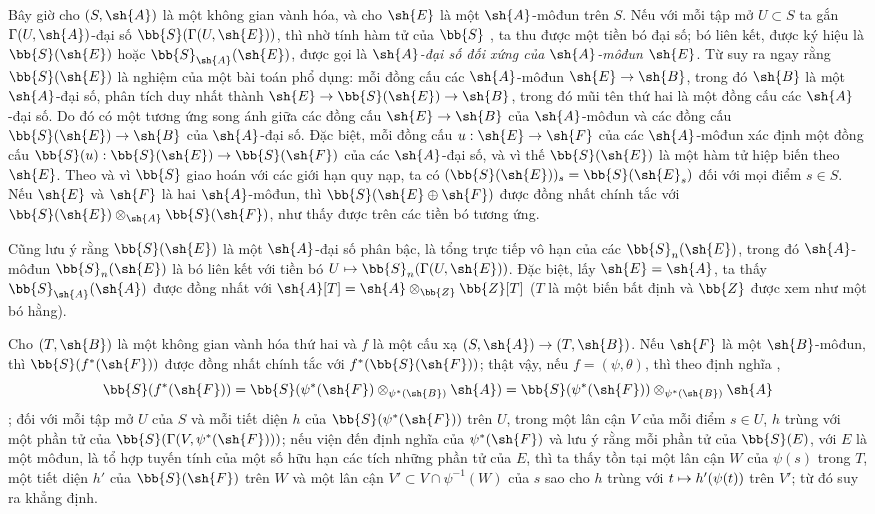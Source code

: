 \documentclass[oneside,10pt]{amsart}
\makeatletter
\newcommand{\ega@arrow}[2]{\mathchoice{#1}{#2}{#2}{#2}}
\let\ega@shortmapsto\mapsto
\renewcommand{\to}{\ega@arrow{\longrightarrow}{\rightarrow}}
\renewcommand{\mapsto}{\ega@arrow{\longmapsto}{\ega@shortmapsto}}
\newcommand{\oldpage}[2][]{\marginnote{\normalfont\footnotesize\textbf{#1}~|~#2}\ignorespaces}
\let\EGAOriginalLabel\label
\renewcommand{\label}[1]{\phantomsection\EGAOriginalLabel{#1}}
\makeatother
\begin{document}
\begin{env}[1.7.4]
\label{II.1.7.4}
Bây giờ cho $(S,\sh{A})$ là một không gian vành hóa, và cho $\sh{E}$ là một $\sh{A}$-môđun trên $S$.
Nếu với mỗi tập mở $U\subset S$ ta gắn $\Gamma(U,\sh{A})$-đại số $\bb{S}(\Gamma(U,\sh{E}))$, thì nhờ tính hàm tử của $\bb{S}$ , ta thu được một tiền bó đại số; bó liên kết, được ký hiệu là $\bb{S}(\sh{E})$ hoặc $\bb{S}_\sh{A}(\sh{E})$, được gọi là \emph{$\sh{A}$-đại số đối xứng của $\sh{A}$-môđun $\sh{E}$}.
Từ  suy ra ngay rằng $\bb{S}(\sh{E})$ là nghiệm của một bài toán phổ dụng: mỗi đồng cấu các $\sh{A}$-môđun $\sh{E}\to\sh{B}$, trong đó $\sh{B}$ là một $\sh{A}$-đại số, phân tích duy nhất thành $\sh{E}\to\bb{S}(\sh{E})\to\sh{B}$, trong đó mũi tên thứ hai là một đồng cấu các $\sh{A}$-đại số.
Do đó có một tương ứng song ánh giữa các đồng cấu $\sh{E}\to\sh{B}$ của $\sh{A}$-môđun và các đồng cấu $\bb{S}(\sh{E})\to\sh{B}$ của $\sh{A}$-đại số.
Đặc biệt, mỗi đồng cấu $u:\sh{E}\to\sh{F}$ của các $\sh{A}$-môđun xác định một đồng cấu $\bb{S}(u):\bb{S}(\sh{E})\to\bb{S}(\sh{F})$ của các $\sh{A}$-đại số, và vì thế $\bb{S}(\sh{E})$ là một hàm tử hiệp biến theo $\sh{E}$.
\oldpage[II]{16}
Theo  và vì $\bb{S}$ giao hoán với các giới hạn quy nạp, ta có $(\bb{S}(\sh{E}))_s=\bb{S}(\sh{E}_s)$ đối với mọi điểm $s\in S$.
Nếu $\sh{E}$ và $\sh{F}$ là hai $\sh{A}$-môđun, thì $\bb{S}(\sh{E}\oplus\sh{F})$ được đồng nhất chính tắc với $\bb{S}(\sh{E})\otimes_\sh{A}\bb{S}(\sh{F})$, như thấy được trên các tiền bó tương ứng.

Cũng lưu ý rằng $\bb{S}(\sh{E})$ là một $\sh{A}$-đại số phân bậc, là tổng trực tiếp vô hạn của các $\bb{S}_n(\sh{E})$, trong đó $\sh{A}$-môđun $\bb{S}_n(\sh{E})$ là bó liên kết với tiền bó $U\mapsto\bb{S}_n(\Gamma(U,\sh{E}))$.
Đặc biệt, lấy $\sh{E}=\sh{A}$, ta thấy $\bb{S}_\sh{A}(\sh{A})$ được đồng nhất với $\sh{A}[T]=\sh{A}\otimes_\bb{Z}\bb{Z}[T]$ ($T$ là một biến bất định và $\bb{Z}$ được xem như một bó hằng).
\end{env}

\begin{env}[1.7.5]
\label{II.1.7.5}
Cho $(T,\sh{B})$ là một không gian vành hóa thứ hai và $f$ là một cấu xạ $(S,\sh{A})\to(T,\sh{B})$.
Nếu $\sh{F}$ là một $\sh{B}$-môđun, thì $\bb{S}(f^*(\sh{F}))$ được đồng nhất chính tắc với $f^*(\bb{S}(\sh{F}))$; thật vậy, nếu $f=(\psi,\theta)$, thì theo định nghĩa ,
\[
  \bb{S}(f^*(\sh{F}))=\bb{S}(\psi^*(\sh{F})\otimes_{\psi^*(\sh{B})}\sh{A})=\bb{S}(\psi^*(\sh{F}))\otimes_{\psi^*(\sh{B})}\sh{A}
\]
; đối với mỗi tập mở $U$ của $S$ và mỗi tiết diện $h$ của $\bb{S}(\psi^*(\sh{F}))$ trên $U$, trong một lân cận $V$ của mỗi điểm $s\in U$, $h$ trùng với một phần tử của $\bb{S}(\Gamma(V,\psi^*(\sh{F})))$; nếu viện đến định nghĩa của $\psi^*(\sh{F})$  và lưu ý rằng mỗi phần tử của $\bb{S}(E)$, với $E$ là một môđun, là tổ hợp tuyến tính của một số hữu hạn các tích những phần tử của $E$, thì ta thấy tồn tại một lân cận $W$ của $\psi(s)$ trong $T$, một tiết diện $h'$ của $\bb{S}(\sh{F})$ trên $W$ và một lân cận $V'\subset V\cap\psi^{-1}(W)$ của $s$ sao cho $h$ trùng với $t\mapsto h'(\psi(t))$ trên $V'$; từ đó suy ra khẳng định.
\end{env}
\end{document}
